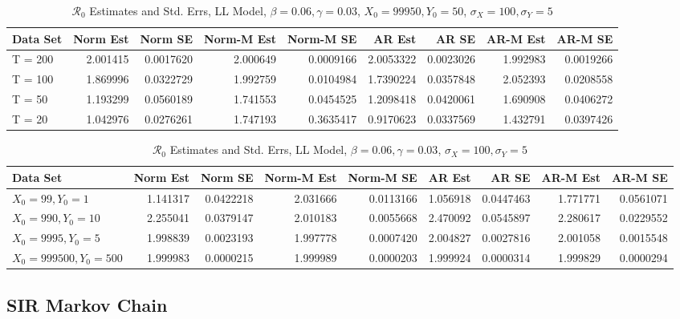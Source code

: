 \documentclass[12pt]{article}
\newcommand{\rr}{\ensuremath{\mathcal{R}_0}}
\begin{document}
\begin{table}[H]
	
	\caption{\label{tab:}$\rr$ Estimates and Std. Errs, LL Model,
		$\beta = 0.06, \gamma = 0.03$, $X_0 = 99950, Y_0 = 50$, $\sigma_X = 100, \sigma_Y = 5$}
	\centering
	\begin{tabular}[t]{l|r|r|r|r|r|r|r|r}
		\hline
		Data Set & Norm Est & Norm SE & Norm-M Est & Norm-M SE & AR Est & AR SE & AR-M Est & AR-M SE\\
		\hline
		T = 200 & 2.001415 & 0.0017620 & 2.000649 & 0.0009166 & 2.0053322 & 0.0023026 & 1.992983 & 0.0019266\\
		\hline
		T = 100 & 1.869996 & 0.0322729 & 1.992759 & 0.0104984 & 1.7390224 & 0.0357848 & 2.052393 & 0.0208558\\
		\hline
		T = 50 & 1.193299 & 0.0560189 & 1.741553 & 0.0454525 & 1.2098418 & 0.0420061 & 1.690908 & 0.0406272\\
		\hline
		T = 20 & 1.042976 & 0.0276261 & 1.747193 & 0.3635417 & 0.9170623 & 0.0337569 & 1.432791 & 0.0397426\\
		\hline
	\end{tabular}
\end{table}

\begin{table}[H]
	
	\caption{\label{tab:}$\rr$ Estimates and Std. Errs, LL Model,
		$\beta = 0.06, \gamma = 0.03$, $\sigma_X = 100, \sigma_Y = 5$}
	\centering
	\begin{tabular}[t]{l|r|r|r|r|r|r|r|r}
		\hline
		Data Set & Norm Est & Norm SE & Norm-M Est & Norm-M SE & AR Est & AR SE & AR-M Est & AR-M SE\\
		\hline
		$X_0 = 99, Y_0 = 1$ & 1.141317 & 0.0422218 & 2.031666 & 0.0113166 & 1.056918 & 0.0447463 & 1.771771 & 0.0561071\\
		\hline
		$X_0 = 990, Y_0 = 10$ & 2.255041 & 0.0379147 & 2.010183 & 0.0055668 & 2.470092 & 0.0545897 & 2.280617 & 0.0229552\\
		\hline
		$X_0 = 9995, Y_0 = 5$ & 1.998839 & 0.0023193 & 1.997778 & 0.0007420 & 2.004827 & 0.0027816 & 2.001058 & 0.0015548\\
		\hline
		$X_0 = 999500, Y_0 = 500$ & 1.999983 & 0.0000215 & 1.999989 & 0.0000203 & 1.999924 & 0.0000314 & 1.999829 & 0.0000294\\
		\hline
	\end{tabular}
\end{table}

\subsection{SIR Markov Chain}
\end{document}
